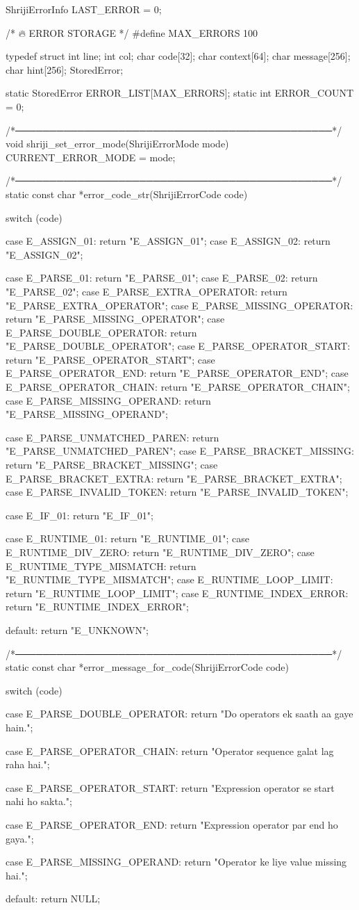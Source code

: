 \documentclass{article}
\begin{document}
ShrijiErrorInfo LAST_ERROR = {0};


/* 🔥 ERROR STORAGE */
#define MAX_ERRORS 100

typedef struct {
    int line;
    int col;
    char code[32];
    char context[64];
    char message[256];
    char hint[256];
} StoredError;

static StoredError ERROR_LIST[MAX_ERRORS];
static int ERROR_COUNT = 0;


/*──────────────────────────────────────────────*/
void shriji_set_error_mode(ShrijiErrorMode mode)
{
    CURRENT_ERROR_MODE = mode;
}


/*──────────────────────────────────────────────*/
static const char *error_code_str(ShrijiErrorCode code)
{
    switch (code) {

        case E_ASSIGN_01: return "E_ASSIGN_01";
        case E_ASSIGN_02: return "E_ASSIGN_02";

        case E_PARSE_01: return "E_PARSE_01";
        case E_PARSE_02: return "E_PARSE_02";
        case E_PARSE_EXTRA_OPERATOR: return "E_PARSE_EXTRA_OPERATOR";
        case E_PARSE_MISSING_OPERATOR: return "E_PARSE_MISSING_OPERATOR";
        case E_PARSE_DOUBLE_OPERATOR: return "E_PARSE_DOUBLE_OPERATOR";
        case E_PARSE_OPERATOR_START: return "E_PARSE_OPERATOR_START";
        case E_PARSE_OPERATOR_END: return "E_PARSE_OPERATOR_END";
        case E_PARSE_OPERATOR_CHAIN: return "E_PARSE_OPERATOR_CHAIN";
        case E_PARSE_MISSING_OPERAND: return "E_PARSE_MISSING_OPERAND";

        case E_PARSE_UNMATCHED_PAREN: return "E_PARSE_UNMATCHED_PAREN";
        case E_PARSE_BRACKET_MISSING: return "E_PARSE_BRACKET_MISSING";
        case E_PARSE_BRACKET_EXTRA: return "E_PARSE_BRACKET_EXTRA";
        case E_PARSE_INVALID_TOKEN: return "E_PARSE_INVALID_TOKEN";

        case E_IF_01: return "E_IF_01";

        case E_RUNTIME_01: return "E_RUNTIME_01";
        case E_RUNTIME_DIV_ZERO: return "E_RUNTIME_DIV_ZERO";
        case E_RUNTIME_TYPE_MISMATCH: return "E_RUNTIME_TYPE_MISMATCH";
        case E_RUNTIME_LOOP_LIMIT: return "E_RUNTIME_LOOP_LIMIT";
        case E_RUNTIME_INDEX_ERROR: return "E_RUNTIME_INDEX_ERROR";

        default: return "E_UNKNOWN";
    }
}


/*──────────────────────────────────────────────*/
static const char *error_message_for_code(ShrijiErrorCode code)
{
    switch (code) {

        case E_PARSE_DOUBLE_OPERATOR:
            return "Do operators ek saath aa gaye hain.";

        case E_PARSE_OPERATOR_CHAIN:
            return "Operator sequence galat lag raha hai.";

        case E_PARSE_OPERATOR_START:
            return "Expression operator se start nahi ho sakta.";

        case E_PARSE_OPERATOR_END:
            return "Expression operator par end ho gaya.";

        case E_PARSE_MISSING_OPERAND:
            return "Operator ke liye value missing hai.";

        default:
            return NULL;
    }
}
\end{document}
